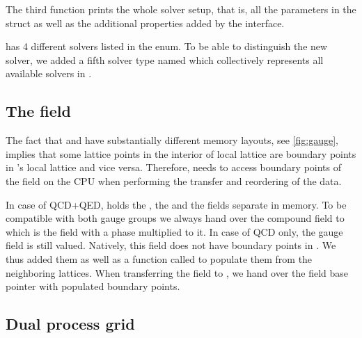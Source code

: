 The third function prints the whole solver setup, that is, all the parameters in the  struct as well as the additional properties added by the interface.

\Openqxd has \num{4} different solvers listed in the  enum. To be able to distinguish the new solver, we added a fifth solver type named  which collectively represents all available solvers in \quda.

\subsection{The  field}

The fact that \openqxd and \quda have substantially different memory layouts, see \cref{fig:gauge}, implies that some lattice points in the interior of \qudas local lattice are boundary points in \openqxd's local lattice and vice versa.
Therefore, \quda needs to access boundary points of the field on the CPU when performing the transfer and reordering of the data.

In case of QCD+QED, \openqxd holds the , the  and the  fields separate in memory.
To be compatible with both gauge groups we always hand over the compound  field to \quda which is the  field with a  phase multiplied to it.
In case of QCD only, the  gauge field is still  valued.
Natively, this field does not have boundary points in \openqxd.
We thus added them as well as a function called  to populate them from the neighboring lattices.
When transferring the field to \quda, we hand over the  field base pointer with populated boundary points.


\subsection{Dual process grid}
\label{sec:interface:openqxd:dual}

